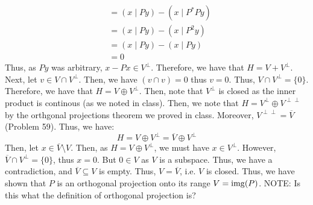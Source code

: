 \documentclass[12pt]{article}
\begin{document}
\begin{solution}
\begin{align*}
        &= (x \mid Py) - (x \mid P^*Py) \\
        &= (x \mid Py) - (x \mid P^2y) \\
        &= (x \mid Py) - (x \mid Py) \\
        &= 0
    \end{align*}
    Thus, as $Py$ was arbitrary, $x - Px \in V^\perp$. Therefore, we have that $H = V + V^\perp$. Next, let $v \in V \cap V^\perp$. Then, we have $(v \cap v) = 0$ thus $v = 0$. Thus, $V \cap V^\perp = \{0\}$. Therefore, we have that $H = V \oplus V^\perp$. \bbni
    Then, note that $V^\perp$ is closed as the inner product is continous (as we noted in class). Then, we note that $H = V^\perp \oplus V^{\perp\perp}$ by the orthgonal projections theorem we proved in class. Moreover, $V^{\perp\perp} = \overline{V}$ (Problem 59). Thus, we have:
    \[ H = V \oplus V^\perp = \overline{V} \oplus V^\perp \]
    Then, let $x \in \overline{V}\setminus V$. Then, as $H = V \oplus V^\perp$, we must have $x \in V^\perp$. However, $\overline{V} \cap V^\perp = \{0\}$, thus $x = 0$. But $0 \in V$ as $V$ is a subspace. Thus, we have a contradiction, and $\overline{V} \subseteq V$ is empty. Thus, $V = \overline{V}$, i.e. $V$ is closed. \bbni
    Thus, we have shown that $P$ is an orthogonal projection onto its range $V = \operatorname{img}(P)$. \bbni
    NOTE: Is this what the definition of orthogonal projection is?
\end{solution}
\newpage
\end{document}
